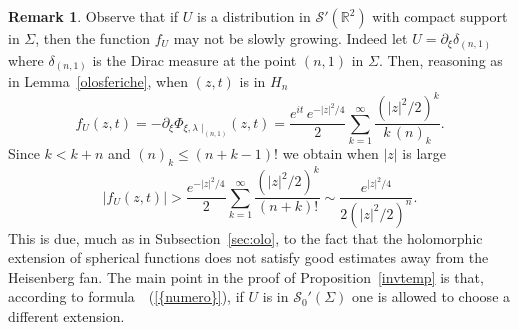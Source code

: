 \documentclass[12pt,a4paper]{amsart}
\theoremstyle{plain}
\theoremstyle{definition}
\newtheorem{remark}[theorem]{Remark}
\numberwithin{equation}{section}
\begin{document}
\begin{remark}
Observe that if $U$ is 
a  distribution in ${\mathcal S}'({\mathbb R}^2)$ with compact support in ${\Sigma}$,
then the function $f_U$
may not be slowly growing.
Indeed let $U=\partial_\xi\delta_{({n},1)}$ where $\delta_{({n},1)}$ is the Dirac measure
at the point $({n},1)$ in ${\Sigma}$. Then, reasoning as in Lemma~\ref{olosferiche},
when $(z,t)$ is in ${{H_{n}}}$
$$
f_U(z,t)=-\partial_\xi\Phi_{\xi,{\lambda}}{\,}_{|_{({n},1)}}(z,t)
=\frac{e^{it}\, e^{-|z|^2/4}}{2}\sum_{k=1}^\infty \frac{(|z|^2/2)^k}{k\, ({n})_k}.
$$
Since $k<k+ {n}$ and $({n})_k\leq ({n}+k-1)!$ we obtain
when $|z|$ is large
$$
|f_U(z,t)|>\frac{e^{-|z|^2/4}}{2}\sum_{k=1}^\infty \frac{(|z|^2/2)^k}{({n}+k)!}
\sim \frac{e^{|z|^2/4}}{2(|z|^2/2)^{n}}.
$$
This is due, much as in Subsection~\ref{sec:olo}, to the fact that
the holomorphic extension of spherical functions does not satisfy good estimates
away from the Heisenberg fan.
The main point in the proof of Proposition~\ref{invtemp} is that,
according to formula~{~(\ref{{numero}})},
if $U$ is in  ${\mathcal S}_0'({\Sigma})$ one is allowed to choose a different extension.
 \end{remark}
\end{document}

